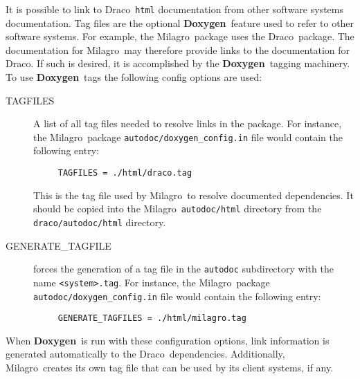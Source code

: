 \documentclass[11pt]{nmemo}
\newcommand{\draco}{{\normalfont\sffamily Draco}}
\newcommand{\milagro}{{\normalfont\sffamily Milagro}}
\newcommand{\doxy}{{\normalfont\bfseries Doxygen}}
\begin{document}
It is possible to link to \draco\ \texttt{html} documentation from other
software systems documentation.
Tag files are the  optional \doxy\ feature used to refer to other software systems. 
For example, the \milagro\
package uses the \draco\ package.  The documentation for \milagro\
may therefore provide links to the documentation for \draco.  If such is 
desired, it is  accomplished
by the \doxy\ tagging machinery.  To use \doxy\ tags the following
config options are used:
\begin{description}

\item[\ttfamily TAGFILES] A list of all tag files needed to resolve
  links in the package.  For instance, the \milagro\ package
  \texttt{autodoc/doxygen\_config.in} file would contain the following entry:
\begin{verbatim}
     TAGFILES = ./html/draco.tag
\end{verbatim}
  This is  the tag file used by \milagro\ to resolve documented
  dependencies. It should be copied into the \milagro\ \texttt{autodoc/html}
  directory from the \texttt{draco/autodoc/html} directory.

\item[\ttfamily GENERATE\_TAGFILE] forces the generation of
  a tag file in the \texttt{autodoc} subdirectory with the name 
  \texttt{<system>.tag}.
For instance, the \milagro\ package
  \texttt{autodoc/doxygen\_config.in} file would contain the following entry:
\begin{verbatim}
     GENERATE_TAGFILES = ./html/milagro.tag
\end{verbatim}

\end{description}
When \doxy\ is run with these configuration options, link information
is generated automatically to the \draco\ dependencies.  Additionally, 
\milagro\ creates its own tag file that can be used by its client
systems, if any.
\end{document}
